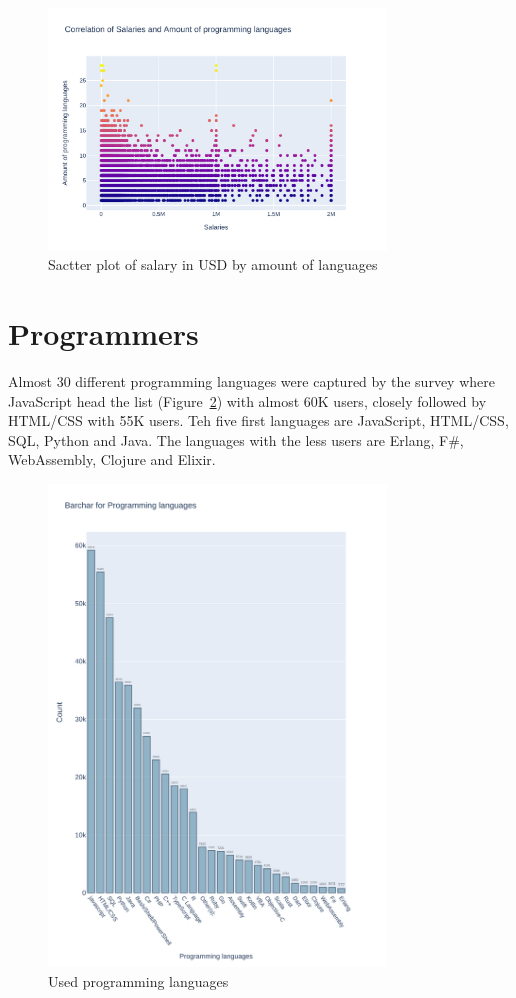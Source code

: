 \documentclass{article}
\begin{document}
\begin{figure}[ht]
    \centering
    \includegraphics[width=0.8\textwidth]{images/salary_amount.pdf}
    \caption{Sactter plot of salary in USD by amount of languages }
    \label{fig:salarybylang}
\end{figure}


\clearpage
\section{Programmers}
Almost 30 different programming languages were captured by the survey where JavaScript head the list (Figure~\ref{fig:proogramminglanguages}) with almost 60K users, closely followed by HTML/CSS with 55K users. Teh five first languages are JavaScript, HTML/CSS, SQL, Python and Java. The languages with the less users are Erlang, F\#, WebAssembly,  Clojure and Elixir.
\begin{figure}[ht]
    \centering
    \includegraphics[width=0.8\textwidth]{images/programminglanguages.pdf}
    \caption{Used programming languages}
    \label{fig:proogramminglanguages}
\end{figure}
\end{document}
